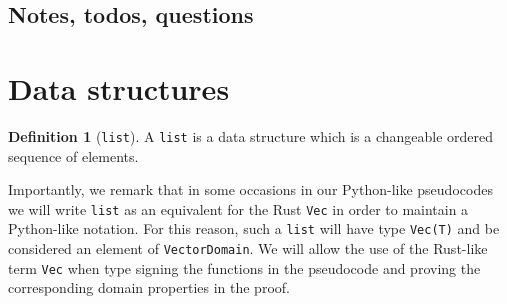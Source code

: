 \documentclass[11pt,a4paper]{article}
\theoremstyle{definition}
\newtheorem{definition}[theorem]{Definition}
\begin{document}
\subsection{Notes, todos, questions}
\section{Data structures}
\begin{definition}[\texttt{list}]
    A \texttt{list} is a data structure which is a changeable ordered sequence of elements.
\end{definition}
Importantly, we remark that in some occasions in our Python-like pseudocodes we will write \texttt{list} as an equivalent for the Rust \texttt{Vec} in order to maintain a Python-like notation. For this reason, such a \texttt{list} will have type \texttt{Vec(T)} and be considered an element of \texttt{VectorDomain}. We will allow the use of the Rust-like term \texttt{Vec} when type signing the functions in the pseudocode and proving the corresponding domain properties in the proof.
\end{document}
